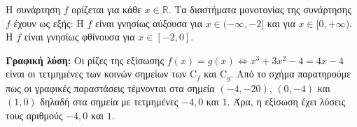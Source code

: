 \begin{alist}
\item Η συνάρτηση $f$ ορίζεται για κάθε $x \in \mathbb{R}$. Τα διαστήματα μονοτονίας της συνάρτησης $f$ έχουν ως εξής:
Η $f$ είναι γνησίως αύξουσα για $x \in (-\infty, -2]$ και για $x \in [0, +\infty)$.
Η $f$ είναι γνησίως φθίνουσα για $x \in [-2, 0]$.
\begin{center}
\end{center}
\item \textbf{Γραφική λύση:}
Οι ρίζες της εξίσωσης $f(x) = g(x) \Leftrightarrow x^3 + 3x^2 - 4 = 4x - 4$ είναι οι τετμημένες των κοινών σημείων των $\text{C}_f$ και $\text{C}_g$.
Από το σχήμα παρατηρούμε πως οι γραφικές παραστάσεις τέμνονται στα σημεία $(-4, -20)$, $(0, -4)$ και $(1, 0)$ δηλαδή στα σημεία με τετμημένες $-4, 0$ και $1$.
Άρα, η εξίσωση έχει λύσεις τους αριθμούς $-4, 0$ και $1$.
\end{alist}

